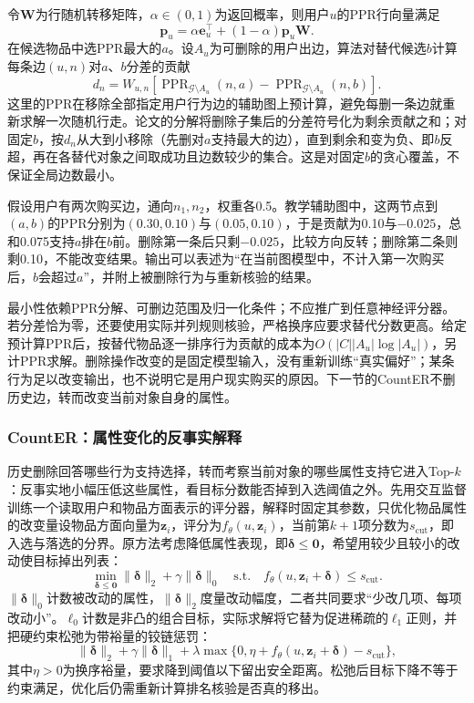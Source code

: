 令$\bm W$为行随机转移矩阵，$\alpha\in(0,1)$为返回概率，则用户$u$的PPR行向量满足
\[
 \bm p_u=\alpha\bm e_u^\top+(1-\alpha)\bm p_u\bm W.
\]
在候选物品中选PPR最大的$a$。设$A_u$为可删除的用户出边，算法对替代候选$b$计算每条边$(u,n)$对$a$、$b$分差的贡献
\[
 d_n=W_{u,n}
 \left[\operatorname{PPR}_{\mathcal G\setminus A_u}(n,a)
      -\operatorname{PPR}_{\mathcal G\setminus A_u}(n,b)\right].
\]
这里的PPR在移除全部指定用户行为边的辅助图上预计算，避免每删一条边就重新求解一次随机行走。论文的分解将删除子集后的分差符号化为剩余贡献之和；对固定$b$，按$d_n$从大到小移除（先删对$a$支持最大的边），直到剩余和变为负、即$b$反超，再在各替代对象之间取成功且边数较少的集合。这是对固定$b$的贪心覆盖，不保证全局边数最小。

假设用户有两次购买边，通向$n_1,n_2$，权重各0.5。教学辅助图中，这两节点到$(a,b)$的PPR分别为$(0.30,0.10)$与$(0.05,0.10)$，于是贡献为0.10与$-0.025$，总和0.075支持$a$排在$b$前。删除第一条后只剩$-0.025$，比较方向反转；删除第二条则剩0.10，不能改变结果。输出可以表述为“在当前图模型中，不计入第一次购买后，$b$会超过$a$”，并附上被删除行为与重新核验的结果。

最小性依赖PPR分解、可删边范围及归一化条件；不应推广到任意神经评分器。若分差恰为零，还要使用实际并列规则核验，严格换序应要求替代分数更高。给定预计算PPR后，按替代物品逐一排序行为贡献的成本为$O(|C||A_u|\log|A_u|)$，另计PPR求解。删除操作改变的是固定模型输入，没有重新训练“真实偏好”；某条行为足以改变输出，也不说明它是用户现实购买的原因。下一节的CountER不删历史边，转而改变当前对象自身的属性。

\subsubsection{CountER：属性变化的反事实解释}
\label{sec:rs-counter}

历史删除回答哪些行为支持选择，转而考察当前对象的哪些属性支持它进入Top-$k$：反事实地小幅压低这些属性，看目标分数能否掉到入选阈值之外。先用交互监督训练一个读取用户和物品方面表示的评分器，解释时固定其参数，只优化物品属性的改变量设物品方面向量为$\bm z_i$，评分为$f_\theta(u,\bm z_i)$，当前第$k+1$项分数为$s_{\mathrm{cut}}$，即入选与落选的分界。原方法考虑降低属性表现，即$\bm\delta\leq\bm0$，希望用较少且较小的改动使目标掉出列表：
\begin{equation}
 \min_{\bm\delta\leq\bm0}
 \lVert\bm\delta\rVert_2+\gamma\lVert\bm\delta\rVert_0
 \quad\text{s.t.}\quad
 f_\theta(u,\bm z_i+\bm\delta)\leq s_{\mathrm{cut}}.
 \label{eq:rs-counter}
\end{equation}
$\lVert\bm\delta\rVert_0$计数被改动的属性，$\lVert\bm\delta\rVert_2$度量改动幅度，二者共同要求“少改几项、每项改动小”。$\ell_0$计数是非凸的组合目标，实际求解将它替为促进稀疏的$\ell_1$正则，并把硬约束松弛为带裕量的铰链惩罚：
\[
 \lVert\bm\delta\rVert_2+\gamma\lVert\bm\delta\rVert_1
 +\lambda\max\{0,\eta+f_\theta(u,\bm z_i+\bm\delta)-s_{\mathrm{cut}}\},
\]
其中$\eta>0$为换序裕量，要求降到阈值以下留出安全距离。松弛后目标下降不等于约束满足，优化后仍需重新计算排名核验是否真的移出。

